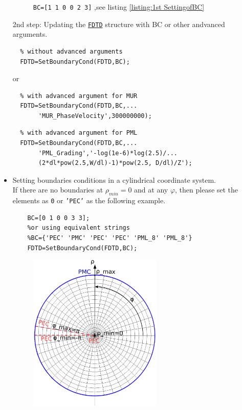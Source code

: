 \begin{itemize}
\begin{myindentpar}
\begin{figure}[ht]
		      \caption[1st example for the setting of boundaries conditions]{\texttt{BC=[1 1  0 0  2 3]} ,see listing \ref{listing:1st SettingofBC}}
		      \label{fig:Ex. 1st of SetBoundaryCond}
		\end{figure}
    \end{myindentpar}
      2nd step: Updating the \hyperref[para:FDTD]{\texttt{FDTD}} structure with BC or other andvanced arguments.
      \begin{myindentpar}	    
		    \begin{lstlisting}
  % without advanced arguments
  FDTD=SetBoundaryCond(FDTD,BC); 
		    \end{lstlisting}
		      or
		    \begin{lstlisting}
  % with advanced argument for MUR
  FDTD=SetBoundaryCond(FDTD,BC,...
       'MUR_PhaseVelocity',300000000);
			\end{lstlisting}
		    \begin{lstlisting}
  % with advanced argument for PML
  FDTD=SetBoundaryCond(FDTD,BC,...
       'PML_Grading','-log(1e-6)*log(2.5)/...
       (2*dl*pow(2.5,W/dl)-1)*pow(2.5, D/dl)/Z');
		    \end{lstlisting}	 
    \end{myindentpar}	
 \item Setting boundaries conditions in a cylindrical coordinate system.\\
If there are no boundaries at  $\rho_{min}=0$ and at any $\varphi$, then please set the elements as \texttt{0} or \texttt{'PEC'} as the following example.
    \begin{lstlisting}[caption={BC assignment in a cylindrical coordinate system as fig \ref{fig:Ex. SetBoundaryCond in cylin.}},label={listing:SettingofBC in a cylin.}]
	% no boundaries at rhomin=0 , phi_min and phi_max
	BC=[0 1 0 0 3 3];
	%or using equivalent strings
	%BC={'PEC' 'PMC' 'PEC' 'PEC' 'PML_8' 'PML_8'} 
	FDTD=SetBoundaryCond(FDTD,BC); 
			\end{lstlisting} 
    \begin{figure}[ht]
			  \centering
			\includegraphics[width=0.6\textwidth]{svg/CylinBCXY.eps}\qquad

\end{figure}
\end{itemize}
